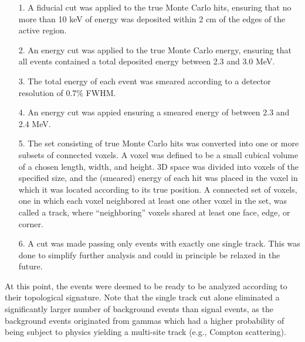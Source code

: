 \documentclass[a4paper,11pt]{article}
\begin{document}
\begin{enumerate}
	\item[1.] A fiducial cut was applied to the true Monte Carlo hits, ensuring that no more than 10 keV of energy was deposited within 2 cm of the edges of the active region.
	\item[2.] An energy cut was applied to the true Monte Carlo energy, ensuring that all events contained a total deposited energy between 2.3 and 3.0 MeV.
	\item[3.] The total energy of each event was smeared according to a detector resolution of 0.7\% FWHM.
	\item[4.] An energy cut was appied ensuring a smeared energy of between 2.3 and 2.4 MeV.
	\item[5.] The set consisting of true Monte Carlo hits was converted into one or more subsets of connected voxels.  A voxel was defined to be a small cubical volume of a chosen 
	length, width, and height.  3D space was divided into voxels of the specified size, and the (smeared) energy of each hit was placed in the voxel in which it was located according to its
	true position.  A connected set of voxels, one in which each voxel neighbored at least one other voxel in the set, was called a track, where ``neighboring'' voxels shared at least one face, edge,
	or corner.
	\item[6.] A cut was made passing only events with exactly one single track.  This was done to simplify further analysis and could in principle be relaxed in the future.
\end{enumerate}

At this point, the events were deemed to be ready to be analyzed according to their topological signature.  Note that the single track cut alone eliminated a significantly larger number of 
background events than signal events, as the background events originated from gammas which had a higher probability of being subject to physics yielding a multi-site track (e.g., Compton 
scattering).
\end{document}
